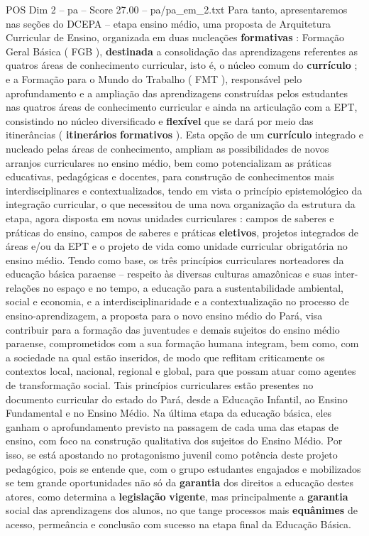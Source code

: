 \begin{textsample}{POS Dim 2 – pa – Score 27.00 – pa/pa\_em\_2.txt}
Para tanto, apresentaremos nas seções do DCEPA – etapa ensino médio, uma proposta de Arquitetura Curricular de Ensino, organizada em duas nucleações \textbf{formativas} : Formação Geral Básica ( FGB ), \textbf{destinada} a consolidação das aprendizagens referentes as quatros áreas de conhecimento curricular, isto é, o núcleo comum do \textbf{currículo} ; e a Formação para o Mundo do Trabalho ( FMT ), responsável pelo aprofundamento e a ampliação das aprendizagens construídas pelos estudantes nas quatros áreas de conhecimento curricular e ainda na articulação com a EPT, consistindo no núcleo diversificado e \textbf{flexível} que se dará por meio das itinerâncias ( \textbf{itinerários} \textbf{formativos} ).
Esta opção de um \textbf{currículo} integrado e nucleado pelas áreas de conhecimento, ampliam as possibilidades de novos arranjos curriculares no ensino médio, bem como potencializam as práticas educativas, pedagógicas e docentes, para construção de conhecimentos mais interdisciplinares e contextualizados, tendo em vista o princípio epistemológico da integração curricular, o que necessitou de uma nova organização da estrutura da etapa, agora disposta em novas unidades curriculares : campos de saberes e práticas do ensino, campos de saberes e práticas \textbf{eletivos}, projetos integrados de áreas e/ou da EPT e o projeto de vida como unidade curricular obrigatória no ensino médio.
Tendo como base, os três princípios curriculares norteadores da educação básica paraense – respeito às diversas culturas amazônicas e suas inter-relações no espaço e no tempo, a educação para a sustentabilidade ambiental, social e economia, e a interdisciplinaridade e a contextualização no processo de ensino-aprendizagem, a proposta para o novo ensino médio do Pará, visa contribuir para a formação das juventudes e demais sujeitos do ensino médio paraense, comprometidos com a sua formação humana integram, bem como, com a sociedade na qual estão inseridos, de modo que reflitam criticamente os contextos local, nacional, regional e global, para que possam atuar como agentes de transformação social.
Tais princípios curriculares estão presentes no documento curricular do estado do Pará, desde a Educação Infantil, ao Ensino Fundamental e no Ensino Médio.
Na última etapa da educação básica, eles ganham o aprofundamento previsto na passagem de cada uma das etapas de ensino, com foco na construção qualitativa dos sujeitos do Ensino Médio.
Por isso, se está apostando no protagonismo juvenil como potência deste projeto pedagógico, pois se entende que, com o grupo estudantes engajados e mobilizados se tem grande oportunidades não só da \textbf{garantia} dos direitos a educação destes atores, como determina a \textbf{legislação} \textbf{vigente}, mas principalmente a \textbf{garantia} social das aprendizagens dos alunos, no que tange processos mais \textbf{equânimes} de acesso, permeância e conclusão com sucesso na etapa final da Educação Básica.

\end{textsample}
